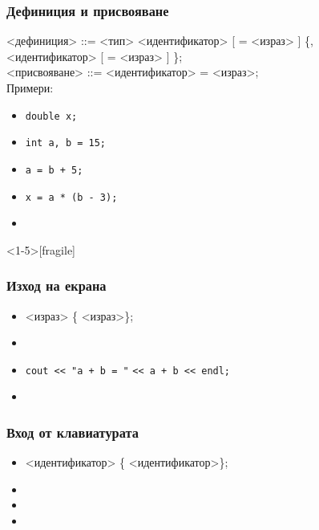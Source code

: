 \documentclass{beamer}
\begin{document}
\begin{frame}[fragile]
  \frametitle{Дефиниция и присвояване}
<дефиниция> ::= <тип>
<идентификатор> [ \tta= <израз> ] \{\tta,\\
\hspace{25ex}
<идентификатор> [ \tta= <израз> ] \}\tta;\\[2em]
<присвояване> ::= <идентификатор> \tta= <израз>\tta;\\[2em]
\pause
Примери:
\begin{itemize}
\item \lstinline{double x;}
\item \lstinline{int a, b = 15;}
\item \lstinline{a = b + 5;}
\item \lstinline{x = a * (b - 3);}
\item {}
\end{itemize}
\end{frame}

\begin{frame}<1-5>[fragile]
  \frametitle{Изход на екрана}

  \begin{itemize}
  \item {} <израз> \{\tta{<{}<} <израз>\}\tta;
  \item {}
  \item<4-> \lstinline{cout << "a + b = "} \lstinline{<< a + b << endl;}
  \item<5-> 
  \end{itemize}
\end{frame}

\begin{frame}
  \frametitle{Вход от клавиатурата}

  \begin{itemize}
  \item {} <идентификатор> \{\tta{>{}>} <идентификатор>\}\tta;
  \item {}
  \item<4-> 
  \item<5-> 
  \end{itemize}
\end{frame}
\end{document}
